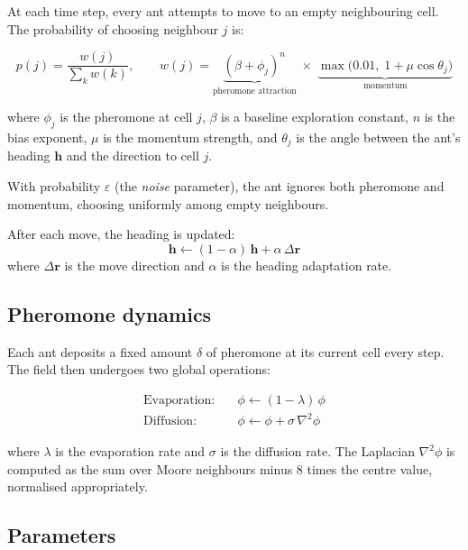 \documentclass[11pt,a4paper]{article}
\begin{document}
At each time step, every ant attempts to move to an empty neighbouring cell.
The probability of choosing neighbour $j$ is:

\begin{equation}
  p(j) = \frac{w(j)}{\sum_k w(k)}, \qquad
  w(j) = \underbrace{(\beta + \phi_j)^n}_{\text{pheromone attraction}}
         \;\times\;
         \underbrace{\max\!\bigl(0.01,\; 1 + \mu \cos\theta_j\bigr)}_{\text{momentum}}
  \label{eq:weight}
\end{equation}

where $\phi_j$ is the pheromone at cell $j$, $\beta$ is a baseline exploration constant, $n$ is the bias exponent, $\mu$ is the momentum strength, and $\theta_j$ is the angle between the ant's heading $\mathbf{h}$ and the direction to cell $j$.

With probability $\varepsilon$ (the \emph{noise} parameter), the ant ignores both pheromone and momentum, choosing uniformly among empty neighbours.

After each move, the heading is updated:
\begin{equation}
  \mathbf{h} \leftarrow (1 - \alpha)\,\mathbf{h} + \alpha\,\Delta\mathbf{r}
  \label{eq:heading}
\end{equation}
where $\Delta\mathbf{r}$ is the move direction and $\alpha$ is the heading adaptation rate.

\subsection{Pheromone dynamics}

Each ant deposits a fixed amount $\delta$ of pheromone at its current cell every step.
The field then undergoes two global operations:

\begin{align}
  \text{Evaporation:} \quad & \phi \leftarrow (1 - \lambda)\,\phi \label{eq:evap} \\
  \text{Diffusion:}   \quad & \phi \leftarrow \phi + \sigma\,\nabla^2\phi \label{eq:diff}
\end{align}

where $\lambda$ is the evaporation rate and $\sigma$ is the diffusion rate.
The Laplacian $\nabla^2\phi$ is computed as the sum over Moore neighbours minus 8 times the centre value, normalised appropriately.

\subsection{Parameters}
\end{document}
